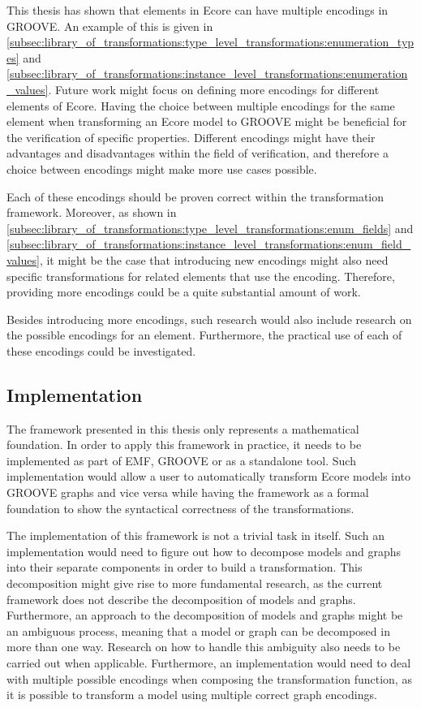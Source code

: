 This thesis has shown that elements in Ecore can have multiple encodings in GROOVE. An example of this is given in \cref{subsec:library_of_transformations:type_level_transformations:enumeration_types} and \cref{subsec:library_of_transformations:instance_level_transformations:enumeration_values}. Future work might focus on defining more encodings for different elements of Ecore. Having the choice between multiple encodings for the same element when transforming an Ecore model to GROOVE might be beneficial for the verification of specific properties. Different encodings might have their advantages and disadvantages within the field of verification, and therefore a choice between encodings might make more use cases possible.

Each of these encodings should be proven correct within the transformation framework. Moreover, as shown in \cref{subsec:library_of_transformations:type_level_transformations:enum_fields} and \cref{subsec:library_of_transformations:instance_level_transformations:enum_field_values}, it might be the case that introducing new encodings might also need specific transformations for related elements that use the encoding. Therefore, providing more encodings could be a quite substantial amount of work.

Besides introducing more encodings, such research would also include research on the possible encodings for an element. Furthermore, the practical use of each of these encodings could be investigated.


\subsection{Implementation}
\label{subsec:conclusion:future_work:implementation}

The framework presented in this thesis only represents a mathematical foundation. In order to apply this framework in practice, it needs to be implemented as part of EMF, GROOVE or as a standalone tool. Such implementation would allow a user to automatically transform Ecore models into GROOVE graphs and vice versa while having the framework as a formal foundation to show the syntactical correctness of the transformations.

The implementation of this framework is not a trivial task in itself. Such an implementation would need to figure out how to decompose models and graphs into their separate components in order to build a transformation. This decomposition might give rise to more fundamental research, as the current framework does not describe the decomposition of models and graphs. Furthermore, an approach to the decomposition of models and graphs might be an ambiguous process, meaning that a model or graph can be decomposed in more than one way. Research on how to handle this ambiguity also needs to be carried out when applicable. Furthermore, an implementation would need to deal with multiple possible encodings when composing the transformation function, as it is possible to transform a model using multiple correct graph encodings.